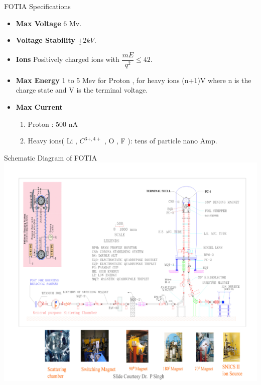 \documentclass[11pt]{beamer}
\begin{document}
\begin{frame}{FOTIA Specifications}

  \begin{itemize}
   
    \item \textbf{Max Voltage} 6 Mv.
    \item \textbf{Voltage Stability} $\underline{+} 2 kV $.
    \item \textbf{Ions} Positively charged ions with $\dfrac{mE}{q^2}   \leqslant 42$.
    \item \textbf{Max Energy} 1 to 5 Mev for Proton , for heavy ions (n+1)V where n is the charge state and V is the terminal voltage.
    \item \textbf{Max Current} 
    \begin{enumerate}
     \item Proton : 500 nA
     \item Heavy ions( Li , $C^{3+,4+}$ , O , F ): tens of particle nano Amp.
    \end{enumerate}
      
   \end{itemize}

\end{frame}

\begin{frame}{Schematic Diagram of FOTIA}
\includegraphics[width=\linewidth]{FOTIA_Page_05.jpg}
\end{frame}
\end{document}
